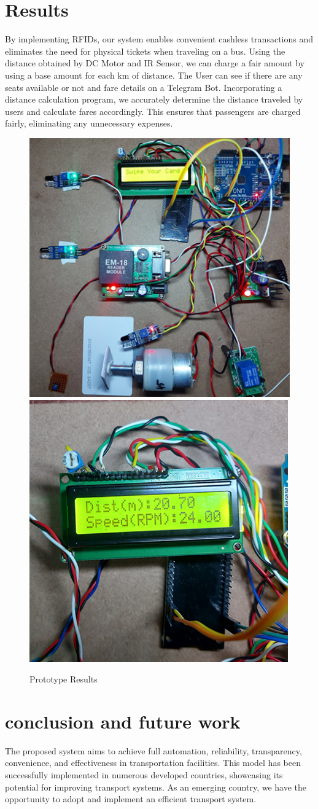 \documentclass[conference]{IEEEtran}
\begin{document}
\section{Results}
By implementing RFIDs, our system enables convenient cashless transactions and eliminates the need for physical tickets when traveling on a bus. Using the distance obtained by DC Motor and IR Sensor, we can charge a fair amount by using a base amount for each km of distance. The User can see if there are any seats available or not and fare details on a Telegram Bot.
Incorporating a distance calculation program, we accurately determine the distance traveled by users and calculate fares accordingly. This ensures that passengers are charged fairly, eliminating any unnecessary expenses.
\begin{figure}[!htb]
    \includegraphics[width=.4\linewidth]{r1.png}\hfill
    \includegraphics[width=.4\linewidth]{r2.png}
    \caption{Prototype Results}\label{fig:foobar}
\end{figure}

\section{conclusion and future work}
The proposed system aims to achieve full automation, reliability, transparency, convenience, and effectiveness in transportation facilities. This model has been successfully implemented in numerous developed countries, showcasing its potential for improving transport systems. As an emerging country, we have the opportunity to adopt and implement an efficient transport system.
\end{document}
